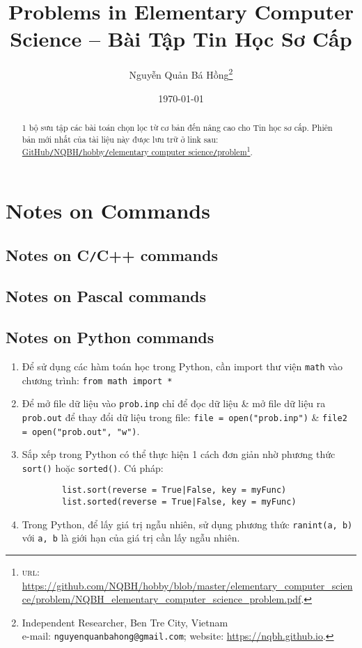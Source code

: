 \documentclass{article}
\title{Problems in Elementary Computer Science -- Bài Tập Tin Học Sơ Cấp}
\author{Nguyễn Quản Bá Hồng\footnote{Independent Researcher, Ben Tre City, Vietnam\\e-mail: \texttt{nguyenquanbahong@gmail.com}; website: \url{https://nqbh.github.io}.}}
\date{\today}
\begin{document}
\maketitle
\begin{abstract}
	1 bộ sưu tập các bài toán chọn lọc từ cơ bản đến nâng cao cho Tin học sơ cấp. Phiên bản mới nhất của tài liệu này được lưu trữ ở link sau: \href{https://github.com/NQBH/hobby/blob/master/elementary_computer_science/problem/NQBH_elementary_computer_science_problem.pdf}{GitHub\texttt{/}NQBH\texttt{/}hobby\texttt{/}elementary computer science\texttt{/}problem}\footnote{\textsc{url}: \url{https://github.com/NQBH/hobby/blob/master/elementary_computer_science/problem/NQBH_elementary_computer_science_problem.pdf}.}.
\end{abstract}
\tableofcontents


\section{Notes on Commands}

\subsection{Notes on C\texttt{/}C++ commands}

\subsection{Notes on Pascal commands}

\subsection{Notes on Python commands}

\begin{enumerate}
	\item Để sử dụng các hàm toán học trong Python, cần import thư viện \texttt{math} vào chương trình: \texttt{from math import *}
	\item Để mở file dữ liệu vào \texttt{prob.inp} chỉ để đọc dữ liệu \& mở file dữ liệu ra \texttt{prob.out} để thay đổi dữ liệu trong file: \texttt{file = open("prob.inp")} \& \texttt{file2 = open("prob.out", "w")}.
	\item Sắp xếp trong Python có thể thực hiện 1 cách đơn giản nhờ phương thức \texttt{sort()} hoặc \texttt{sorted()}. Cú pháp:
	\begin{verbatim}
		list.sort(reverse = True|False, key = myFunc)
		list.sorted(reverse = True|False, key = myFunc)
	\end{verbatim}
	\item Trong Python, để lấy giá trị ngẫu nhiên, sử dụng phương thức \texttt{ranint(a, b)} với \texttt{a, b} là giới hạn của giá trị cần lấy ngẫu nhiên.
\end{enumerate}
\end{document}
